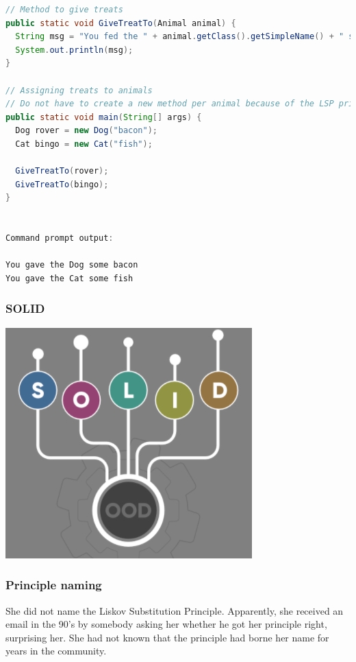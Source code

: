 \documentclass{beamer}
\begin{document}
\begin{lstlisting}[language=Java]
// Method to give treats
public static void GiveTreatTo(Animal animal) {
  String msg = "You fed the " + animal.getClass().getSimpleName() + " some "  + animal.favoriteFood;
  System.out.println(msg);
}

// Assigning treats to animals
// Do not have to create a new method per animal because of the LSP principle
public static void main(String[] args) {
  Dog rover = new Dog("bacon");
  Cat bingo = new Cat("fish");

  GiveTreatTo(rover);
  GiveTreatTo(bingo);
}


Command prompt output:

You gave the Dog some bacon
You gave the Cat some fish
\end{lstlisting}


\begin{frame}
\frametitle{SOLID} 

\includegraphics[scale=0.8]{SOLID}
\centering


\end{frame}


\begin{frame}
\frametitle{Principle naming}
She did not name the Liskov Substitution Principle. Apparently, she received an email in the 90’s by somebody asking her whether he got her principle right, surprising her. She had not known that the principle had borne her name for years in the community.
\end{frame}
\end{document}
